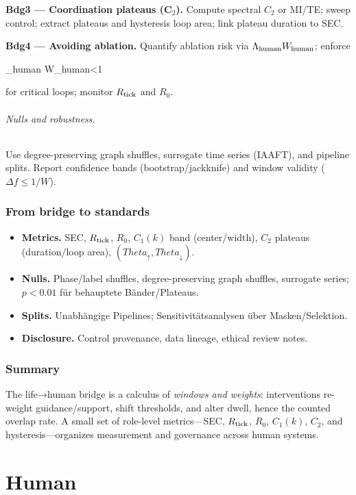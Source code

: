 \documentclass[12pt,a4paper,oneside]{scrreprt}
\def\Theta{Theta}%
\def\({}%
\def\){}%
\begin{document}
\textbf{Bdg3 — Coordination plateaus (C$_2$).}
Compute spectral $C_2$ or MI/TE; sweep control; extract plateaus and hysteresis loop area; link plateau duration to SEC.

\textbf{Bdg4 — Avoiding ablation.}
Quantify ablation risk via $\Lambda_{\rm human} W_{\rm human}$; enforce 
\(
\Lambda_{\rm human} W_{\rm human}<1
\)
for critical loops; monitor $R_{\rm tick}$ and $R_0$.

\paragraph{Nulls and robustness.}
Use degree-preserving graph shuffles, surrogate time series (IAAFT), and pipeline splits. Report confidence bands (bootstrap/jackknife) and window validity ($\Delta f\le 1/W$).

\section{From bridge to standards}\label{sec:bridge-standards}
\begin{itemize}
\item \textbf{Metrics.} SEC, $R_{\rm tick}$, $R_0$, $C_1(k)$ band (center/width), $C_2$ plateaus (duration/loop area), $(\Theta_\uparrow,\Theta_\downarrow)$.
\item \textbf{Nulls.} Phase/label shuffles, degree-preserving graph shuffles, surrogate series; $p<0.01$ für behauptete Bänder/Plateaus.
\item \textbf{Splits.} Unabhängige Pipelines; Sensitivitätsanalysen über Masken/Selektion.
\item \textbf{Disclosure.} Control provenance, data lineage, ethical review notes.
\end{itemize}

\section*{Summary}
The life→human bridge is a calculus of \emph{windows and weights}: interventions re-weight guidance/support, shift thresholds, and alter dwell, hence the counted overlap rate. 
A small set of role-level metrics—SEC, $R_{\rm tick}$, $R_0$, $C_1(k)$, $C_2$, and hysteresis—organizes measurement and governance across human systems.

\part{Human}
\end{document}
